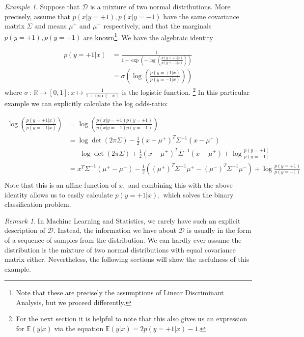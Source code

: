 \documentclass[BSc]{usydthesis}
\numberwithin{equation}{chapter}
\theoremstyle{remark}
\newtheorem{Remark}[equation]{Remark}
\newtheorem{Example}[equation]{Example}
\newcommand{\map}[2]{\,{:}\,#1\!\longrightarrow\!#2}
\begin{document}
\begin{Example}\label{a}
 Suppose that $\mathcal{D}$ is a mixture of two normal distributions. More precisely, assume that $p(x|y=+1), p(x|y=-1)$ have the same covariance matrix $\Sigma$ and means $\mu^+$ and $\mu^-$ respectively, and that the marginals $p(y=+1), p(y=-1)$ are known\footnote{Note that these are precisely the assumptions of Linear Discriminant Analysis, but we proceed differently.}. We have the algebraic identity 
 
 \begin{align}
  p(y=+1|x) &= \frac{1}{1+ \exp\left( - \log \left( \frac{p(y=+1|x)}{p(y=-1|x)} \right) \right)}\\
            &= \sigma\left( \log \left( \frac{p(y=+1|x)}{p(y=-1|x)} \right) \right) \label{logit_id}
 \end{align}
where $\sigma \map{\mathbb{R}}{[0,1]} : x \mapsto \frac{1}{1+\exp(-x)}$ is the logistic function. \footnote{For the next section it is helpful to note that this also gives us an expression for  $\mathbb{E}(y|x)$ via the equation $\mathbb{E}(y|x) = 2p(y=+1|x)-1.$  }
In this particular example we can explicitly calculate the log odds-ratio:

\begin{align*}
 \log \left( \frac{p(y=+1|x)}{p(y=-1|x)} \right) &= \log \left( \frac{p(x|y=+1)p(y=+1)}{p(x|y=-1)p(y=-1)} \right) \\
                                                 &= \log \det(2\pi\Sigma) - \frac{1}{2} (x-\mu^+)^T\Sigma^{-1}(x-\mu^+) \\
                                                 &\ \ -\log \det(2\pi\Sigma) + \frac{1}{2} (x-\mu^+)^T\Sigma^{-1}(x-\mu^+) + \log \frac{p(y=+1)}{p(y=-1)} \\
                                                 &= x^T \Sigma^{-1}(\mu^+ - \mu^-) - \frac{1}{2} \left((\mu^+)^T\Sigma^{-1}\mu^+ -(\mu^-)^T\Sigma^{-1}\mu^- \right) + \log \frac{p(y=+1)}{p(y=-1)}\\
\end{align*}
Note that this is an affine function of $x,$ and combining this with the above identity allows us to easily calculate $p(y=+1|x),$ which solves the binary classification problem.
\end{Example}

\begin{Remark}
 In Machine Learning and Statistics, we rarely have such an explicit description of $\mathcal{D}.$ Instead, the information we have about $\mathcal{D}$ is usually in the form of a sequence of samples from the distribution. We can hardly ever assume the distribution is the mixture of two normal distributions with equal covariance matrix either. Nevertheless, the following sections will show the usefulness of this example.
\end{Remark}
\end{document}

